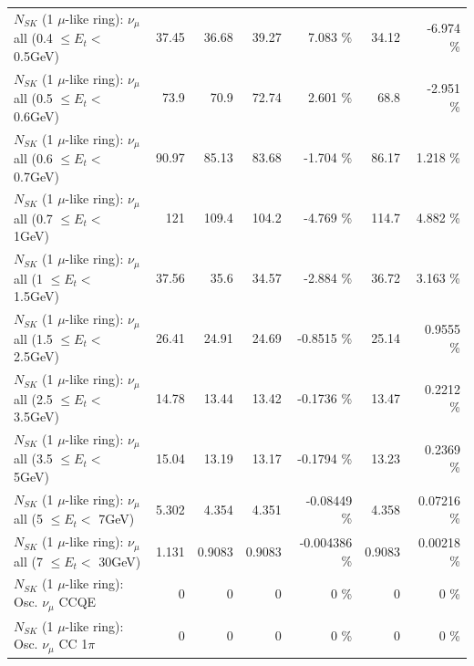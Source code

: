 \begin{table}
\begin{tabular}{| l | r | r | r  r | r  r |}
       $N_{SK}$ (1 $\mu$-like ring): $\nu_{\mu}$ all (0.4 $\leq E_{t} <$ 0.5GeV) &           37.45 &           36.68 &           39.27 &    7.083 \%  &           34.12 &   -6.974 \%  \\ 
       $N_{SK}$ (1 $\mu$-like ring): $\nu_{\mu}$ all (0.5 $\leq E_{t} <$ 0.6GeV) &            73.9 &            70.9 &           72.74 &    2.601 \%  &            68.8 &   -2.951 \%  \\ 
       $N_{SK}$ (1 $\mu$-like ring): $\nu_{\mu}$ all (0.6 $\leq E_{t} <$ 0.7GeV) &           90.97 &           85.13 &           83.68 &   -1.704 \%  &           86.17 &    1.218 \%  \\ 
         $N_{SK}$ (1 $\mu$-like ring): $\nu_{\mu}$ all (0.7 $\leq E_{t} <$ 1GeV) &             121 &           109.4 &           104.2 &   -4.769 \%  &           114.7 &    4.882 \%  \\ 
         $N_{SK}$ (1 $\mu$-like ring): $\nu_{\mu}$ all (1 $\leq E_{t} <$ 1.5GeV) &           37.56 &            35.6 &           34.57 &   -2.884 \%  &           36.72 &    3.163 \%  \\ 
       $N_{SK}$ (1 $\mu$-like ring): $\nu_{\mu}$ all (1.5 $\leq E_{t} <$ 2.5GeV) &           26.41 &           24.91 &           24.69 &  -0.8515 \%  &           25.14 &   0.9555 \%  \\ 
       $N_{SK}$ (1 $\mu$-like ring): $\nu_{\mu}$ all (2.5 $\leq E_{t} <$ 3.5GeV) &           14.78 &           13.44 &           13.42 &  -0.1736 \%  &           13.47 &   0.2212 \%  \\ 
         $N_{SK}$ (1 $\mu$-like ring): $\nu_{\mu}$ all (3.5 $\leq E_{t} <$ 5GeV) &           15.04 &           13.19 &           13.17 &  -0.1794 \%  &           13.23 &   0.2369 \%  \\ 
           $N_{SK}$ (1 $\mu$-like ring): $\nu_{\mu}$ all (5 $\leq E_{t} <$ 7GeV) &           5.302 &           4.354 &           4.351 & -0.08449 \%  &           4.358 &  0.07216 \%  \\ 
          $N_{SK}$ (1 $\mu$-like ring): $\nu_{\mu}$ all (7 $\leq E_{t} <$ 30GeV) &           1.131 &          0.9083 &          0.9083 & -0.004386 \%  &          0.9083 &  0.00218 \%  \\ 
\hline
\hline
                               $N_{SK}$ (1 $\mu$-like ring): Osc. $\nu_\mu$ CCQE &               0 &               0 &               0 &        0 \%  &               0 &        0 \%  \\ 
                          $N_{SK}$ (1 $\mu$-like ring): Osc. $\nu_\mu$ CC 1$\pi$ &               0 &               0 &               0 &        0 \%  &               0 &        0 \%  \\ 

\end{tabular}
\end{table}
